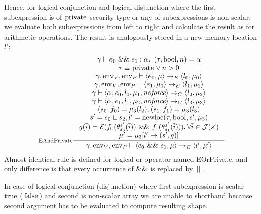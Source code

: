 \documentclass[a4paper, 10pt, draft]{report}
\DeclareMathOperator*{\env}{env}
\DeclareMathOperator*{\newloc}{newloc}
\DeclareMathOperator*{\noforce}{\mathit{noforce}}
\newcommand{\mycode}[1]{\ensuremath{\mbox{\lstinline{#1}}}}
\begin{document}
Hence, for logical conjunction and logical disjunction where the first
subexpression is of \mycode{private} security type or any of subexpressions is
non-scalar, we evaluate both subexpressions from left to right and calculate
the result as for arithmetic operations. The result is analogously stored in a
new memory location $l'$:
\[\begin{array}{c}
\inference[EAndPrivate]{
  \gamma |- e_0\ \mycode{&&}\ e_1 : \alpha,\ \left( \tau, \mycode{bool} , n \right) = \alpha \\
  \tau \equiv \mycode{private} \lor n > 0 \\
  \gamma, \env_V, \env_P |- \left<e_0, \mu \right> \to_E \left<l_0, \mu_0 \right> \\
  \gamma, \env_V, \env_P |- \left<e_1, \mu_0 \right> \to_E \left<l_1, \mu_1 \right> \\
  \gamma |- \left<\alpha, e_0, l_0, \mu_1, \noforce \right> \to_C \left<l_2, \mu_2 \right> \\
  \gamma |- \left<\alpha, e_1, l_1, \mu_2, \noforce \right> \to_C \left<l_3, \mu_3 \right> \\
  (s_0,f_0) = \mu_3(l_2), (s_1,f_1) = \mu_3(l_3) \\
  s' = s_0 \sqcup s_2, l' = \newloc(\tau, \mycode{bool}, s', \mu_3) \\
  g(\overline{i}) = \mathcal{E}(f_0(\theta_{s_0}^{s'}(\overline{i}))\ \mycode{&&}\ f_1(\theta_{s_1}^{s'}(\overline{i}))), \forall \overline{i} \in \mathcal{J}(s') \\
  \mu' = \mu_3[l' \mapsto (s',g)]
}{
  \gamma, \env_V, \env_P |- \left<e_0\ \mycode{&&}\ e_1, \mu \right> \to_E \left<l', \mu' \right>
}

\end{array}\]
Almost identical rule is defined for logical or operator named EOrPrivate, and
only difference is that every occurrence of $\mycode{&&}$ is replaced by
$\mycode{||}$.

In case of logical conjunction (disjunction) where first subexpression is
scalar \mycode{true} (\mycode{false}) and second is non-scalar array we are
unable to shorthand because second argument has to be evaluated to compute
resulting shape.
\end{document}
